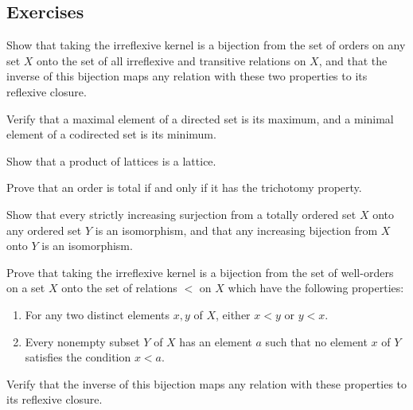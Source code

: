 \documentclass{article}
\begin{document}
\subsection{Exercises}
\label{sec:q1c2w2jy}

\begin{exercise}
  \label{exe:eydusvz3}
  Show that taking the irreflexive kernel is a bijection from the set
  of orders on any set \(X\) onto the set of all irreflexive and
  transitive relations on \(X\), and that the inverse of this
  bijection maps any relation with these two properties to its
  reflexive closure.
\end{exercise}

\begin{exercise}
  \label{exe:swjbrepg}
  Verify that a maximal element of a directed set is its maximum, and
  a minimal element of a codirected set is its minimum.
\end{exercise}

\begin{exercise}
  \label{exe:yowl3axc}
  Show that a product of lattices is a lattice.
\end{exercise}

\begin{exercise}
  \label{exe:4knqif5b}
  Prove that an order is total if and only if it has the trichotomy
  property.
\end{exercise}

\begin{exercise}
  \label{exe:v1tw1ijd}
  Show that every strictly increasing surjection from a totally
  ordered set \(X\) onto any ordered set \(Y\) is an isomorphism, and
  that any increasing bijection from \(X\) onto \(Y\) is an
  isomorphism.
\end{exercise}

\begin{exercise}
  \label{exe:4q4vnvbc}
  Prove that taking the irreflexive kernel is a bijection from the set
  of well-orders on a set \(X\) onto the set of relations \(<\) on
  \(X\) which have the following properties:
  \begin{enumerate}
  \item For any two distinct elements \(x, y\) of \(X\), either
    \(x < y\) or \(y < x\).
  \item Every nonempty subset \(Y\) of \(X\) has an element \(a\) such
    that no element \(x\) of \(Y\) satisfies the condition \(x < a\).
  \end{enumerate}
  Verify that the inverse of this bijection maps any relation with
  these properties to its reflexive closure.
\end{exercise}
\end{document}
